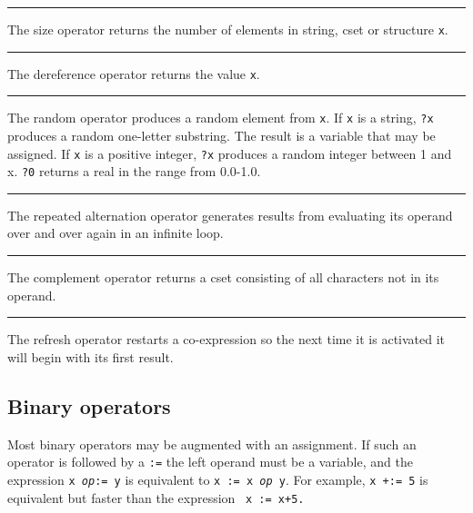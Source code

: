 \bigskip\hrule\vspace{0.1cm}

\noindent
The size operator returns the number of elements in
string, cset or structure \texttt{x}.

\bigskip\hrule\vspace{0.1cm}

\noindent
The dereference operator returns the value
\texttt{x}.

\bigskip\hrule\vspace{0.1cm}

\noindent
The random operator produces a random element
from \texttt{x}. If \texttt{x} is a string, \texttt{?x} produces a
random one-letter substring. The result is a variable that may be
assigned. If \texttt{x} is a positive integer, \texttt{?x} produces a
random integer between 1 and x.  \texttt{?0} returns a real in the
range from 0.0-1.0.

\bigskip\hrule\vspace{0.1cm}

\noindent
The repeated alternation operator generates
results from evaluating its operand over and over again in an infinite
loop.

\bigskip\hrule\vspace{0.1cm}

\noindent
The complement operator returns a cset
consisting of all characters not in its operand.

\bigskip\hrule\vspace{0.1cm}

\noindent
{}The refresh operator restarts a
co-expression so the next time it is activated it will begin with its
first result.

\subsection*{Binary operators}

Most binary operators may be augmented with an
assignment. If such an operator is followed
by a \texttt{:=} the left operand must be a variable, and the
expression \texttt{x }\texttt{\textit{op}}\texttt{:= y} is equivalent
to \texttt{x := x }\texttt{\textit{op}}\texttt{ y}. For example,
\texttt{x +:= 5} is equivalent but faster than the expression
\ \texttt{x := x+5.}

